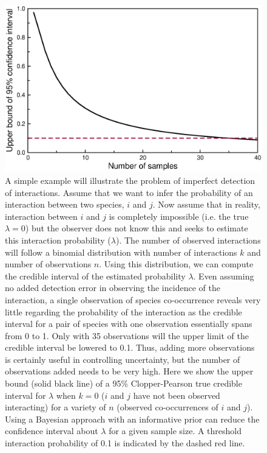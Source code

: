\documentclass[12pt]{article}
\begin{document}




  \begin{figure}[h!]
    \caption{A simple example will illustrate the problem of imperfect detection of interactions. Assume that we want to infer the probability of an interaction between two species, $i$ and $j$. Now assume that in reality, interaction between $i$ and $j$ is completely impossible (i.e. the true $\lambda=0$) but the observer does not know this and seeks to estimate this interaction probability ($\lambda$). The number of observed interactions will follow a binomial distribution with number of interactions $k$ and number of observations $n$. Using this distribution, we can compute the credible interval of the estimated probability $\lambda$. Even assuming no added detection error in observing the incidence of the interaction, a single observation of species co-occurrence reveals very little regarding the probability of the interaction as the credible interval for a pair of species with one observation essentially spans from 0 to 1. Only with 35 observations will the upper limit of the credible interval be lowered to 0.1. Thus, adding more observations is certainly useful in controlling uncertainty, but the number of observations added needs to be very high. Here we show the upper bound (solid black line) of a 95\% Clopper-Pearson true credible interval for $\lambda$ when $k=0$ ($i$ and $j$ have not been observed interacting) for a variety of $n$ (observed co-occurrences of $i$ and $j$). Using a Bayesian approach with an informative prior can reduce the confidence interval about $\lambda$ for a given sample size. A threshold interaction probability of 0.1 is indicated by the dashed red line. }
    \label{upper_limits}
    \includegraphics*[width=.8\textwidth]{figures/upper_limit_DG.eps}
  \end{figure}
\end{document}
